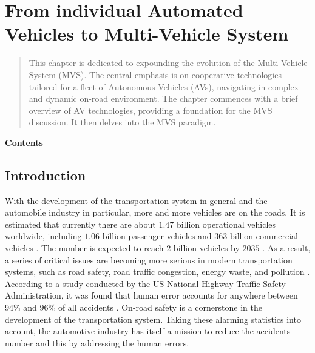 \chapter{From individual Automated Vehicles to Multi-Vehicle System}
\label{chap:chapter1}







\begin{abstract}
This chapter is dedicated to expounding the evolution of the Multi-Vehicle System (MVS). The central emphasis is on cooperative technologies tailored for a fleet of Autonomous Vehicles (AVs), navigating in complex and dynamic on-road environment. The chapter commences with a brief overview of AV technologies, providing a foundation for the MVS discussion. It then delves into the MVS paradigm. 
    
\end{abstract}


\textbf{Contents}
\vspace{0.15cm}
\hline
\hspace{2cm}
\localtableofcontents
\hspace{2cm}
\hline











\section{Introduction}



With the development of the transportation system in general and the automobile industry in particular, more and more vehicles are on the roads. It is estimated that currently there are about $1.47$ billion operational vehicles worldwide, including $1.06$ billion passenger vehicles and $363$ billion commercial vehicles \cite{NumberCars}\cite{ACEA}. The number is expected to reach $2$ billion vehicles by $2035$ \cite{GHI}. As a result, a series of critical issues are becoming more serious in modern transportation systems, such as road safety, road traffic congestion, energy waste, and pollution \cite{7056505}. According to a study conducted by the US National Highway Traffic Safety Administration, it was found that human error accounts for anywhere between $94\%$ and $96\%$ of all accidents \cite{NHTSA}. On-road safety is a cornerstone in the development of the transportation system. Taking these alarming statistics into account, the automotive industry has itself a mission to reduce the accidents number and this by addressing the human errors. 



